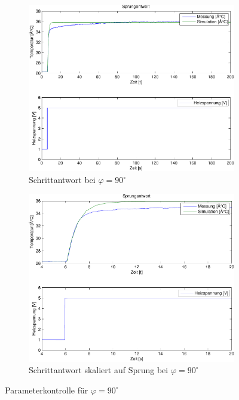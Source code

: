 \begin{figure}[h!]
    \begin{subfigure}{0.475\textwidth}
        \includegraphics[width=1\textwidth]{04/step_mod_sim_90.pdf}
        \caption{Schrittantwort bei $\varphi = 90^\circ$}
    \end{subfigure}
    \hfill{}
    \begin{subfigure}{0.475\textwidth}
        \includegraphics[width=1\textwidth]{04/step_mod_sim_90_scale.pdf}
        \caption{Schrittantwort skaliert auf Sprung bei $\varphi = 90^\circ$}
    \end{subfigure}
    \caption{Parameterkontrolle für $\varphi = 90^\circ$}
\end{figure}

